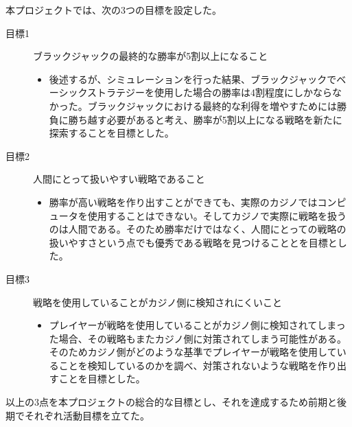 本プロジェクトでは、次の3つの目標を設定した。
\begin{description}
\item[目標1] ブラックジャックの最終的な勝率が5割以上になること
\begin{itemize}
\item{後述するが、シミュレーションを行った結果、ブラックジャックでベーシックストラテジーを使用した場合の勝率は4割程度にしかならなかった。ブラックジャックにおける最終的な利得を増やすためには勝負に勝ち越す必要があると考え、勝率が5割以上になる戦略を新たに探索することを目標とした。}
\end{itemize}
\item[目標2] 人間にとって扱いやすい戦略であること
\begin{itemize}
\item{勝率が高い戦略を作り出すことができても、実際のカジノではコンピュータを使用することはできない。そしてカジノで実際に戦略を扱うのは人間である。そのため勝率だけではなく、人間にとっての戦略の扱いやすさという点でも優秀である戦略を見つけることとを目標とした。}
\end{itemize}
\item[目標3] 戦略を使用していることがカジノ側に検知されにくいこと
\begin{itemize}
\item{プレイヤーが戦略を使用していることがカジノ側に検知されてしまった場合、その戦略もまたカジノ側に対策されてしまう可能性がある。そのためカジノ側がどのような基準でプレイヤーが戦略を使用していることを検知しているのかを調べ、対策されないような戦略を作り出すことを目標とした。}
\end{itemize}
\end{description}
以上の3点を本プロジェクトの総合的な目標とし、それを達成するため前期と後期でそれぞれ活動目標を立てた。
